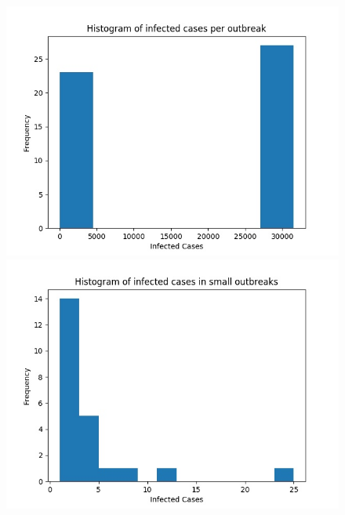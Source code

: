\documentclass[runningheads]{llncs}
\begin{document}
\begin{figure}
	\includegraphics[width=\textwidth]{extinction_all.jpg}	
	\caption{}
	\label{fig3}
	
	\includegraphics[width=\textwidth]{extinction_small.jpg}
	\caption{}	
	\label{fig4}
\end{figure}
\newpage
\end{document}
